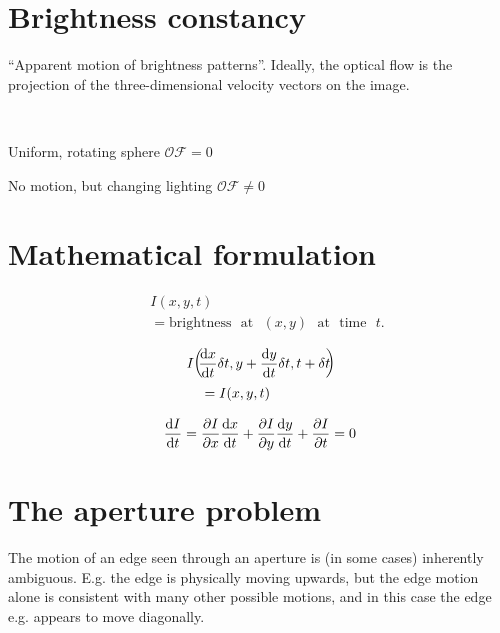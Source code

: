 \section{Brightness constancy}
\begin{compactdesc}
	\item[\lp{Definition of Optical Flow}]\hfill ``Apparent motion of brightness patterns''. Ideally, the optical flow is the projection of the three-dimensional velocity vectors on the image.
	\item[\lp{Caution required}]\hfill\\
		\begin{enumerate*}[label=\protect\circled{\arabic*},itemjoin=]
			\item Uniform, rotating sphere $\mathcal{OF}=0$\\
			\item No motion, but changing lighting $\mathcal{OF}\neq0$\\
		\end{enumerate*}
		\section{Mathematical formulation}
		\begin{align*}
		&I(x,y,t)\\
		\;&=\text{brightness}\text{ }\text{at}\text{ }(x,y)\text{ }\text{at}\text{ }\text{time}\text{ }t.
		\end{align*}
	\item[\lp{Brightness constancy assumption:}]
		\begin{align*}
			&I\!\left(\!\! \frac{\mathrm d x}{\mathrm d t}\delta t,y+\frac{\mathrm d y}{\mathrm d t} \delta t,t+\delta t \!\!\right)\!\\
			&\quad=I(x,y,t)
		\end{align*}
	\item[\lp{Optical flow constraint equation:}]
		\begin{gather*}
			\frac{\mathrm d I}{\mathrm d t}=\frac{\partial I}{\partial x}\frac{\mathrm d x}{\mathrm d t}+\frac{\partial I}{\partial y}\frac{\mathrm d y}{\mathrm d t}+\frac{\partial I}{\partial t}=0
		\end{gather*}
		\section{The aperture problem}
		The motion of an edge seen through an aperture is (in some cases) inherently ambiguous. E.g. the edge is physically moving upwards, but the edge motion alone is consistent with many other possible motions, and in this case the edge e.g. appears to move diagonally.

\end{compactdesc}
